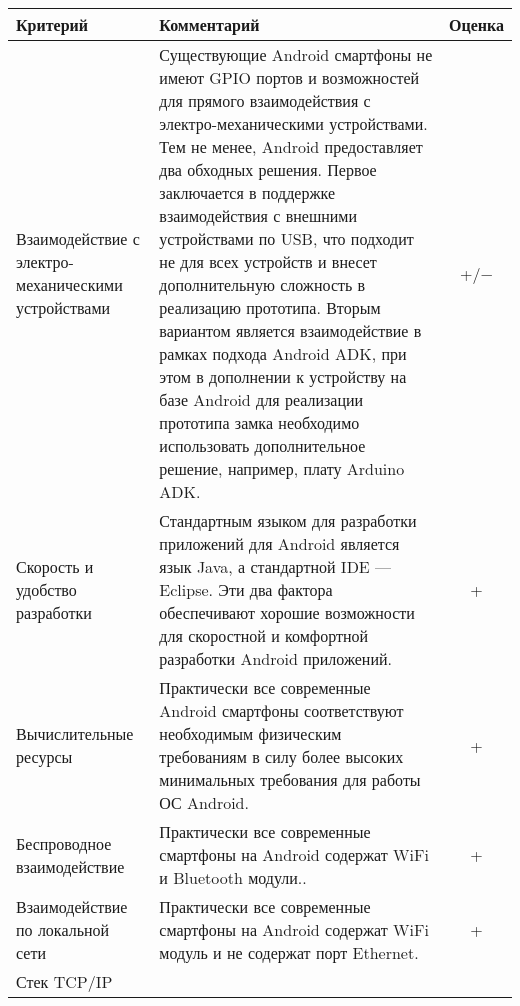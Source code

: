 \documentclass[twoside,a4paper]{msmb} %
\begin{document}
\begin{longtable}{| p{} | p{} | c |} 

\hline
Критерий & Комментарий & Оценка \\
\hline
Взаимодействие с электро-механическими  устройствами &

Существующие Android смартфоны не имеют GPIO портов и возможностей для прямого взаимодействия с электро-механическими устройствами\cite{AndroidSmarts}. Тем не менее, Android предоставляет два обходных решения. Первое заключается в поддержке взаимодействия с внешними устройствами по USB\cite{AndroidUSB}, что подходит не для всех устройств и внесет дополнительную сложность в реализацию прототипа. Вторым вариантом является взаимодействие в рамках подхода Android ADK\cite{AndroidUSB}, при этом в дополнении к устройству на базе Android для реализации прототипа замка необходимо использовать дополнительное решение, например, плату Arduino ADK. &

+/$-$\\

\hline
Скорость и удобство разработки &

Стандартным языком для разработки приложений для Android является язык Java, а стандартной IDE --- Eclipse\cite{Android}. Эти два фактора обеспечивают хорошие возможности для скоростной и комфортной разработки Android приложений. &

+\\

\hline
Вычислительные ресурсы &

Практически все современные Android смартфоны соответствуют необходимым физическим требованиям\cite{AndroidSmarts} в силу более высоких минимальных требования для работы ОС Android\cite{AndroidHR}. &

+\\

\hline
Беспроводное взаимодействие &

Практически все современные смартфоны на Android содержат WiFi и Bluetooth модули.\cite{AndroidSmarts}. &

+\\

\hline
Взаимодействие по локальной сети &

Практически все современные смартфоны на Android содержат WiFi модуль и не содержат порт Ethernet\cite{AndroidSmarts}.&

+\\

\hline
Стек TCP/IP &


\end{longtable}
\end{document}
